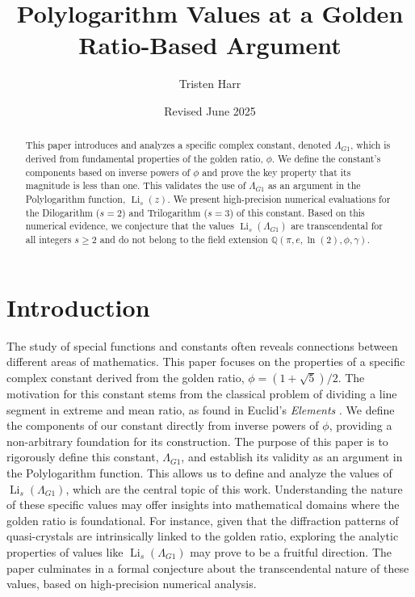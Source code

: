\documentclass{amsart}
\theoremstyle{plain}
\theoremstyle{definition}
\theoremstyle{remark}
\DeclareMathOperator{\Li}{Li} %
\newcommand{\LambdaG}{\Lambda_{G1}}
\begin{document}
\title[Polylogarithms at a Golden Ratio Argument]{Polylogarithm Values at a Golden Ratio-Based Argument}
\author{Tristen Harr}
\date{Revised June 2025}

\begin{abstract}
This paper introduces and analyzes a specific complex constant, denoted $\LambdaG$, which is derived from fundamental properties of the golden ratio, $\phi$.
We define the constant's components based on inverse powers of $\phi$ and prove the key property that its magnitude is less than one.
This validates the use of $\LambdaG$ as an argument in the Polylogarithm function, $\Li_s(z)$.
We present high-precision numerical evaluations for the Dilogarithm ($s=2$) and Trilogarithm ($s=3$) of this constant.
Based on this numerical evidence, we conjecture that the values $\Li_s(\LambdaG)$ are transcendental for all integers $s \ge 2$ and do not belong to the field extension $\mathbb{Q}(\pi, e, \ln(2), \phi, \gamma)$.
\end{abstract}

\maketitle

\section{Introduction}
The study of special functions and constants often reveals connections between different areas of mathematics.
This paper focuses on the properties of a specific complex constant derived from the golden ratio, $\phi = (1+\sqrt{5})/2$.
The motivation for this constant stems from the classical problem of dividing a line segment in extreme and mean ratio, as found in Euclid's \textit{Elements} \cite{Euclid}.
We define the components of our constant directly from inverse powers of $\phi$, providing a non-arbitrary foundation for its construction.
The purpose of this paper is to rigorously define this constant, $\LambdaG$, and establish its validity as an argument in the Polylogarithm function.
This allows us to define and analyze the values of $\Li_s(\LambdaG)$, which are the central topic of this work. Understanding the nature of these specific values may offer insights into mathematical domains where the golden ratio is foundational. For instance, given that the diffraction patterns of quasi-crystals are intrinsically linked to the golden ratio, exploring the analytic properties of values like $\Li_s(\LambdaG)$ may prove to be a fruitful direction.
The paper culminates in a formal conjecture about the transcendental nature of these values, based on high-precision numerical analysis.
\end{document}

